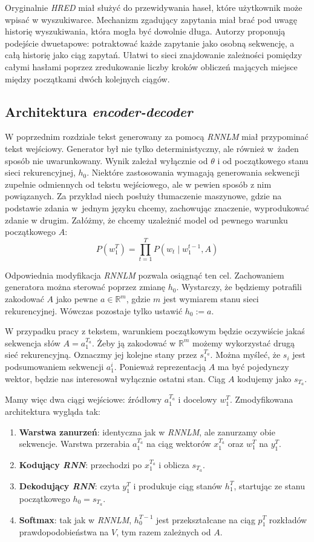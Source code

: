 Oryginalnie \textit{HRED} miał służyć do przewidywania haseł, które użytkownik może wpisać w wyszukiwarce. Mechanizm zgadujący zapytania miał brać pod uwagę historię wyszukiwania, która mogła być dowolnie długa. Autorzy proponują podejście dwuetapowe: potraktować każde zapytanie jako osobną sekwencję, a całą historię jako ciąg zapytań. Ułatwi to sieci znajdowanie zależności pomiędzy całymi hasłami poprzez zredukowanie liczby kroków obliczeń mających miejsce między początkami dwóch kolejnych ciągów.


\subsection{Architektura \textit{encoder-decoder}}
W poprzednim rozdziale tekst generowany za pomocą \textit{RNNLM} miał przypominać tekst wejściowy. Generator był nie tylko deterministyczny, ale również w żaden sposób nie uwarunkowany. Wynik zależał wyłącznie od $\theta$ i od początkowego stanu sieci rekurencyjnej, $h_0$. Niektóre zastosowania wymagają generowania sekwencji zupełnie odmiennych od tekstu wejściowego, ale w pewien sposób z nim powiązanych. Za przykład niech posłuży tłumaczenie maszynowe, gdzie na podstawie zdania w~jednym języku chcemy, zachowując znaczenie, wyprodukować zdanie w drugim. Załóżmy, że chcemy uzależnić model od pewnego warunku początkowego $A$:
\[P(w_1^T) = \prod\limits_{t=1}^T P(w_t \mid w_1^{t-1}, A)\]

Odpowiednia modyfikacja \textit{RNNLM} pozwala osiągnąć ten cel. Zachowaniem generatora można sterować poprzez zmianę $h_0$. Wystarczy, że będziemy potrafili zakodować $A$ jako pewne $a \in \mathbb{R}^m$, gdzie $m$ jest wymiarem stanu sieci rekurencyjnej. Wówczas pozostaje tylko ustawić $h_0 := a$.

W przypadku pracy z tekstem, warunkiem początkowym będzie oczywiście jakaś sekwencja słów $A = a_1^{T_a}$. Żeby ją zakodować w $\mathbb{R}^m$ możemy wykorzystać drugą sieć rekurencyjną. Oznaczmy jej kolejne stany przez $s_1^{T_a}$. Można myśleć, że $s_i$ jest podsumowaniem sekwencji $a_1^i$. Ponieważ reprezentacją $A$ ma być pojedynczy wektor, będzie nas interesował wyłącznie ostatni stan. Ciąg $A$ kodujemy jako $s_{T_a}$.

Mamy więc dwa ciągi wejściowe: źródłowy $a_1^{T_a}$ i docelowy $w_1^T$. Zmodyfikowana architektura wygląda tak:
\begin{enumerate}
    \item \textbf{Warstwa zanurzeń}: identyczna jak w \textit{RNNLM}, ale zanurzamy obie sekwencje. Warstwa przerabia $a_1^{T_a}$ na ciąg wektorów $x_1^{T_a}$ oraz $w_1^T$ na $y_1^T$.
    \item \textbf{Kodujący \textit{RNN}}: przechodzi po $x_1^{T_a}$ i oblicza $s_{T_a}$.
    \item \textbf{Dekodujący \textit{RNN}}: czyta $y_1^T$ i produkuje ciąg stanów $h_1^T$, startując ze stanu początkowego $h_0 = s_{T_a}$.
    \item \textbf{Softmax}: tak jak w \textit{RNNLM}, $h_0^{T-1}$ jest przekształcane na ciąg $p_1^T$ rozkładów prawdopodobieństwa na $V$, tym razem zależnych od $A$.
\end{enumerate}


